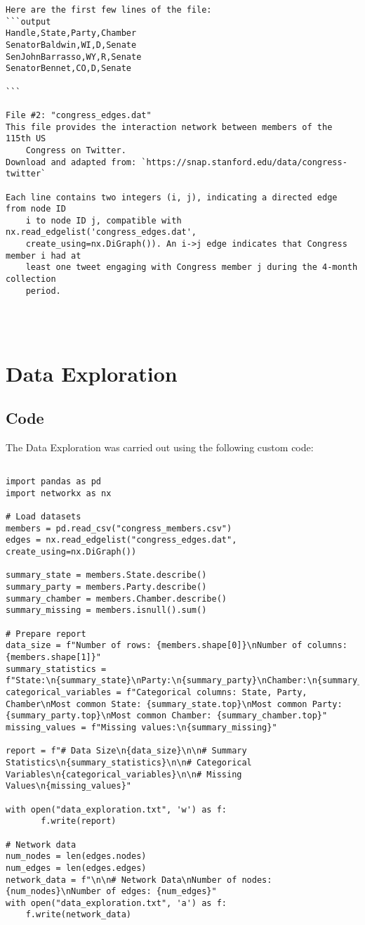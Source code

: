 \documentclass[11pt]{article}
\begin{document}
\begin{Verbatim}[tabsize=4]
Here are the first few lines of the file:
```output
Handle,State,Party,Chamber
SenatorBaldwin,WI,D,Senate
SenJohnBarrasso,WY,R,Senate
SenatorBennet,CO,D,Senate

```

File #2: "congress_edges.dat"
This file provides the interaction network between members of the 115th US
	Congress on Twitter.
Download and adapted from: `https://snap.stanford.edu/data/congress-twitter`

Each line contains two integers (i, j), indicating a directed edge from node ID
	i to node ID j, compatible with nx.read_edgelist('congress_edges.dat',
	create_using=nx.DiGraph()). An i->j edge indicates that Congress member i had at
	least one tweet engaging with Congress member j during the 4-month collection
	period.




\end{Verbatim}

\section{Data Exploration}
\subsection{{Code}}
The Data Exploration was carried out using the following custom code:

\begin{verbatim}

import pandas as pd
import networkx as nx

# Load datasets
members = pd.read_csv("congress_members.csv")
edges = nx.read_edgelist("congress_edges.dat", create_using=nx.DiGraph())

summary_state = members.State.describe()
summary_party = members.Party.describe()
summary_chamber = members.Chamber.describe()
summary_missing = members.isnull().sum()

# Prepare report
data_size = f"Number of rows: {members.shape[0]}\nNumber of columns: {members.shape[1]}"
summary_statistics = f"State:\n{summary_state}\nParty:\n{summary_party}\nChamber:\n{summary_chamber}"
categorical_variables = f"Categorical columns: State, Party, Chamber\nMost common State: {summary_state.top}\nMost common Party: {summary_party.top}\nMost common Chamber: {summary_chamber.top}"
missing_values = f"Missing values:\n{summary_missing}"

report = f"# Data Size\n{data_size}\n\n# Summary Statistics\n{summary_statistics}\n\n# Categorical Variables\n{categorical_variables}\n\n# Missing Values\n{missing_values}"

with open("data_exploration.txt", 'w') as f:
       f.write(report)

# Network data
num_nodes = len(edges.nodes)
num_edges = len(edges.edges)
network_data = f"\n\n# Network Data\nNumber of nodes: {num_nodes}\nNumber of edges: {num_edges}"
with open("data_exploration.txt", 'a') as f:
    f.write(network_data)

\end{verbatim}
\end{document}
